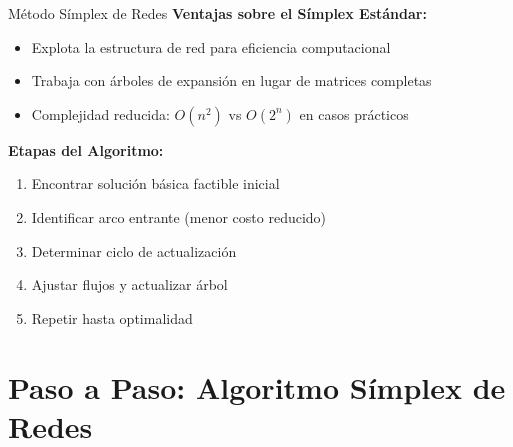 \documentclass{beamer}
\begin{document}
\begin{frame}{Método Símplex de Redes}
\textbf{Ventajas sobre el Símplex Estándar:}
\begin{itemize}
    \item Explota la estructura de red para eficiencia computacional
    \item Trabaja con árboles de expansión en lugar de matrices completas
    \item Complejidad reducida: $O(n^2)$ vs $O(2^n)$ en casos prácticos
\end{itemize}

\textbf{Etapas del Algoritmo:}
\begin{enumerate}
    \item Encontrar solución básica factible inicial
    \item Identificar arco entrante (menor costo reducido)
    \item Determinar ciclo de actualización
    \item Ajustar flujos y actualizar árbol
    \item Repetir hasta optimalidad
\end{enumerate}
\end{frame}

\section{Paso a Paso: Algoritmo Símplex de Redes}
\end{document}
